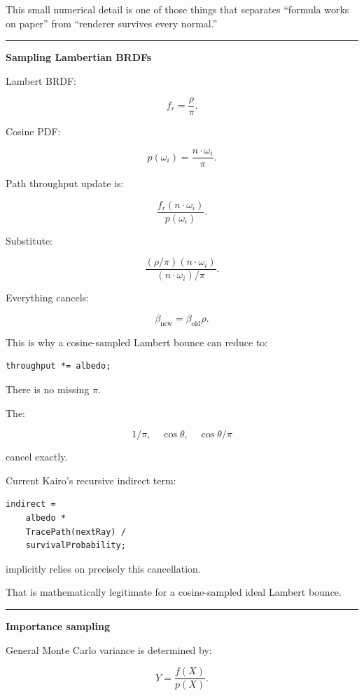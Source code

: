 This small numerical detail is one of those things that separates ``formula works on paper'' from ``renderer survives every normal.''

\begin{center}\rule{0.5\linewidth}{0.5pt}\end{center}

\textbf{Sampling Lambertian BRDFs}

Lambert BRDF:

\[
f_r=\frac{\rho}{\pi}.
\]

Cosine PDF:

\[
p(\omega_i)
=
\frac{n\cdot\omega_i}{\pi}.
\]

Path throughput update is:

\[
\frac{
f_r
(n\cdot\omega_i)
}{
p(\omega_i)
}.
\]

Substitute:

\[
\frac{
(\rho/\pi)
(n\cdot\omega_i)
}{
(n\cdot\omega_i)/\pi
}.
\]

Everything cancels:

\[
\boxed{
\beta_{\text{new}}
=
\beta_{\text{old}}\rho.
}
\]

This is why a cosine-sampled Lambert bounce can reduce to:

\begin{verbatim}
throughput *= albedo;
\end{verbatim}

There is no missing \(\pi\).

The:

\[
1/\pi,
\quad
\cos\theta,
\quad
\cos\theta/\pi
\]

cancel exactly.

Current Kairo's recursive indirect term:

\begin{verbatim}
indirect =
    albedo *
    TracePath(nextRay) /
    survivalProbability;
\end{verbatim}

implicitly relies on precisely this cancellation.

That is mathematically legitimate for a cosine-sampled ideal Lambert bounce.

\begin{center}\rule{0.5\linewidth}{0.5pt}\end{center}

\textbf{Importance sampling}

General Monte Carlo variance is determined by:

\[
Y=
\frac{f(X)}{p(X)}.
\]

